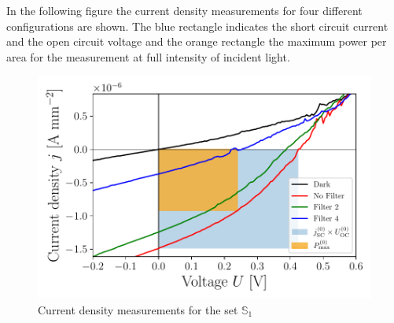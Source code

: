 \documentclass[a4paper,10pt,twocolumn]{article}
\begin{document}
\begin{extract*}

In the following figure the current density measurements for four different configurations are shown. The blue rectangle indicates the short circuit current and the open circuit voltage and the orange rectangle the maximum power per area for the measurement at full intensity of incident light.

\begin{figure}[h]\centering
	\includegraphics[width=\columnwidth]{../../../IV-Curve-Analysis/OSC1Graph.pdf}
	\caption{Current density measurements for the set $\mathbb{S}_1$}
	\label{fig:OSC1Graph}
\end{figure}


\end{extract*}
\end{document}
